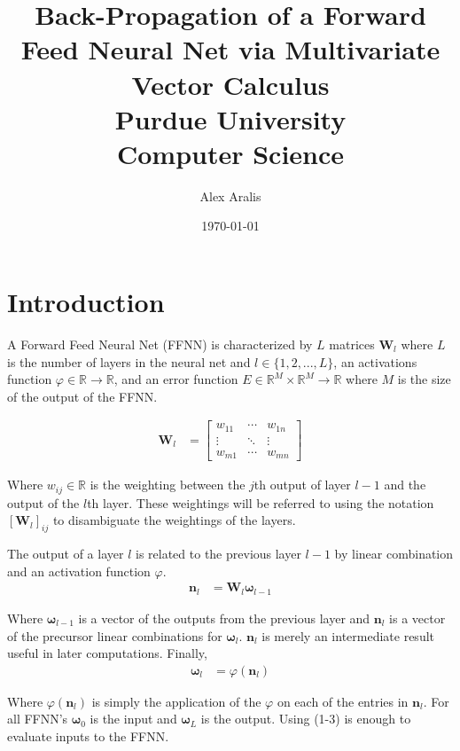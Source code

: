 \documentclass[12pt,letterpaper]{article}
\title{\textbf{Back-Propagation of a Forward Feed Neural Net via Multivariate Vector Calculus } \\ Purdue University \\ \small{Computer Science}}
\author{Alex Aralis}
\date{\today}
\begin{document}
\maketitle

\section{Introduction}

A Forward Feed Neural Net (FFNN) is characterized by $L$ matrices $\textbf{W}_l$ where $L$ is the number of layers in the neural net and $l \in \{1, 2,... , L\}$, an activations function $\varphi \in  \mathbb{R} \to  \mathbb{R}$, and an error function $E \in  \mathbb{R}^M \times \mathbb{R}^M \to  \mathbb{R}$ where $M$ is the size of the output of the FFNN.  

\begin{align}
\boldsymbol{W}_l 
&=
\begin{bmatrix}
w_{11} & \cdots & w_{1n}\\ 
\vdots &  \ddots & \vdots\\ 
w_{m1} & \cdots & w_{mn}
\end{bmatrix}
\end{align}

Where $w_{ij} \in \mathbb{R}$ is the weighting between the $j$th output of layer $l-1$ and the output of the $l$th layer.  These weightings will be referred to using the notation $\left[\boldsymbol{W}_l\right]_{ij}$ to disambiguate the weightings of the layers.

The output of a layer $l$ is related to the previous layer $l-1$ by linear combination and an activation function $\varphi$. 
\begin{align}
\boldsymbol{n}_l 
&= 
\boldsymbol{W}_l \boldsymbol{\omega}_{l-1}
\end{align}

Where $\boldsymbol{\omega}_{l-1}$ is a vector of the outputs from the previous layer and $\boldsymbol{n}_l$ is a vector of the precursor linear combinations for $\boldsymbol{\omega}_{l}$. $\boldsymbol{n}_l$ is merely an intermediate result useful in later computations. Finally,
\begin{align}
\boldsymbol{\omega}_{l} 
&= 
\varphi(\boldsymbol{n}_l)
\end{align}

Where $\varphi(\boldsymbol{n}_l)$ is simply the application of the $\varphi$ on each of the entries in $\boldsymbol{n}_l$.  For all FFNN's $\boldsymbol{\omega}_0$ is the input and $\boldsymbol{\omega}_L$ is the output.  Using (1-3) is enough to evaluate inputs to the FFNN.
\end{document}
